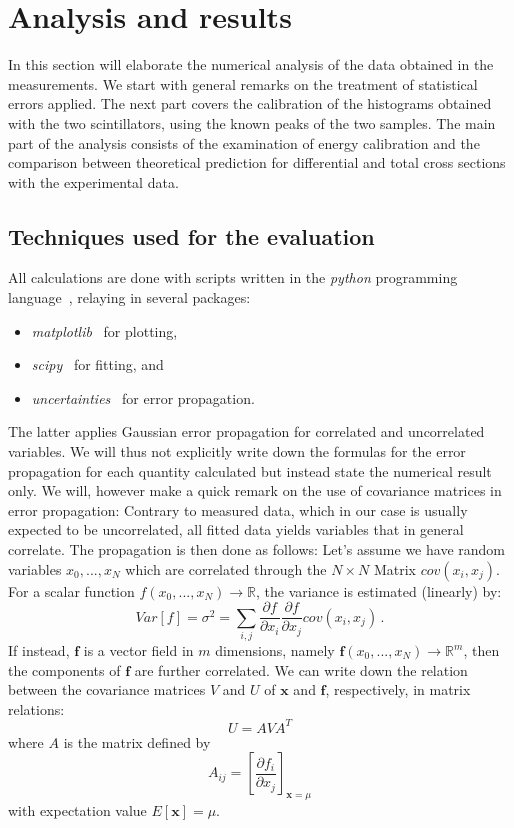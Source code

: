 \clearpage
\section{Analysis and results}
\label{sec:analysis}
In this section will elaborate the numerical analysis of the
data obtained in the measurements. We start with general remarks on the 
treatment of statistical errors applied. The next part covers the calibration 
of the histograms obtained with the two scintillators, using the known 
peaks of the two samples. The main part of the analysis consists of the 
examination of energy calibration and the comparison between theoretical 
prediction for differential and total cross sections with the experimental 
data. 

\subsection{Techniques used for the evaluation}
\label{sub:techique}
All calculations are done with scripts written in 
the \textit{python} programming language~\cite{python}, relaying in several 
packages:
\begin{itemize}
    \item
        \textit{matplotlib}~\cite{Hunter2007} for plotting,
    \item
        \textit{scipy}~\cite{scipy} for fitting, and 
    \item
        \textit{uncertainties}~\cite{uc} for error propagation.
\end{itemize}
The latter applies Gaussian error propagation for correlated and uncorrelated variables. 
We will thus not explicitly write down the formulas for the error propagation 
for each quantity calculated but instead state the numerical result only. 
We will, however make a quick remark on the use of covariance matrices in 
error propagation: Contrary to measured data, which in our case is usually 
expected to be uncorrelated, all fitted data yields variables that in general correlate. 
The propagation is then done as follows:
Let's assume we have random
variables $x_0,...,x_N$ which are correlated through the $N\times N$ Matrix $cov(x_i,x_j)$.
For a scalar function $f(x_0,...,x_N) \rightarrow \mathbb{R}$, the variance is estimated (linearly) by:
\begin{equation}
Var[f] = \sigma^2 = \sum_{i,j} \frac{\partial f}{\partial x_i} \frac{\partial f}{\partial x_j} cov(x_i,x_j) \,.
\end{equation} 
If instead, $\mathbf{f}$ is a vector field in $m$ dimensions, namely 
$\mathbf{f}(x_0,...,x_N) \rightarrow \mathbb{R}^m$, then the components of $\mathbf{f}$ 
are further correlated. We can write down the relation between the covariance matrices $V$ and $U$ of 
$\mathbf{x}$ and $\mathbf{f}$, respectively, in matrix relations:
\begin{equation}
    U = A V A^T
\end{equation}
where $A$ is the matrix defined by 
\begin{equation}
    A_{ij} = \left[ \frac{\partial f_i}{\partial x_j}\right]_{\mathbf{x} = \mu}
\end{equation}
with expectation value $E[\mathbf{x}] = \mu$.~\cite{cowan1998statistical}

